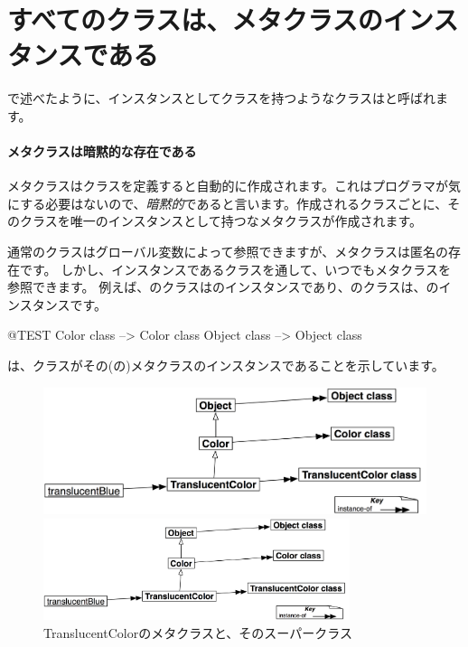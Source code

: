 \documentclass[a4paper,10pt,twoside]{book}
\begin{document}
\section{すべてのクラスは、メタクラスのインスタンスである}


で述べたように、インスタンスとしてクラスを持つようなクラスはと呼ばれます。

\paragraph{メタクラスは暗黙的な存在である}
メタクラスはクラスを定義すると自動的に作成されます。これはプログラマが気にする必要はないので、\emph{暗黙的}であると言います。作成されるクラスごとに、そのクラスを唯一のインスタンスとして持つなメタクラスが作成されます。

通常のクラスはグローバル変数によって参照できますが、メタクラスは匿名の存在です。
しかし、インスタンスであるクラスを通して、いつでもメタクラスを参照できます。
例えば、のクラスはのインスタンスであり、のクラスは、のインスタンスです。
\begin{code}{@TEST}
Color class   --> Color class
Object class --> Object class
\end{code}

\noindent
{}は、クラスがその(の)メタクラスのインスタンスであることを示しています。

\begin{center}
\begin{figure}[!ht]
\ifluluelse
	{\centerline {\includegraphics[width=\textwidth]{TranslucentMetaclasses}}}
	{\centerline {\includegraphics[width=0.8\textwidth]{TranslucentMetaclasses}}}
\caption{TranslucentColorのメタクラスと、そのスーパークラス}
\end{figure}
\end{center}
\end{document}
